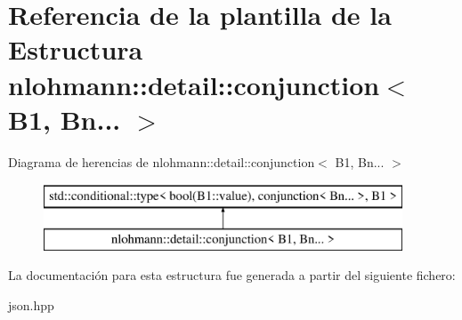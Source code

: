 \hypertarget{structnlohmann_1_1detail_1_1conjunction_3_01B1_00_01Bn_8_8_8_01_4}{}\section{Referencia de la plantilla de la Estructura nlohmann\+:\+:detail\+:\+:conjunction$<$ B1, Bn... $>$}
\label{structnlohmann_1_1detail_1_1conjunction_3_01B1_00_01Bn_8_8_8_01_4}
Diagrama de herencias de nlohmann\+:\+:detail\+:\+:conjunction$<$ B1, Bn... $>$\begin{figure}[H]
\begin{center}
\leavevmode
\includegraphics[height=2.000000cm]{structnlohmann_1_1detail_1_1conjunction_3_01B1_00_01Bn_8_8_8_01_4}
\end{center}
\end{figure}


La documentación para esta estructura fue generada a partir del siguiente fichero\+:\begin{DoxyCompactItemize}
\item 
json.\+hpp\end{DoxyCompactItemize}
